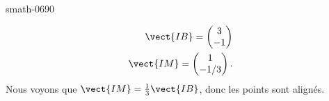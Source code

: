 \begin{corrige}{smath-0690}
\begin{enumerate}
            \begin{subequations}
                \begin{align}
                    \vect{ IB }=\begin{pmatrix}
                        3    \\ 
                        -1    
                    \end{pmatrix}\\
                    \vect{ IM }=\begin{pmatrix}
                        1    \\ 
                        -1/3    
                    \end{pmatrix}.
                \end{align}
            \end{subequations}
            Nous voyons que \( \vect{ IM }=\frac{1}{ 3 }\vect{ IB }\), donc les points sont alignés.
    \end{enumerate}
\end{corrige}
